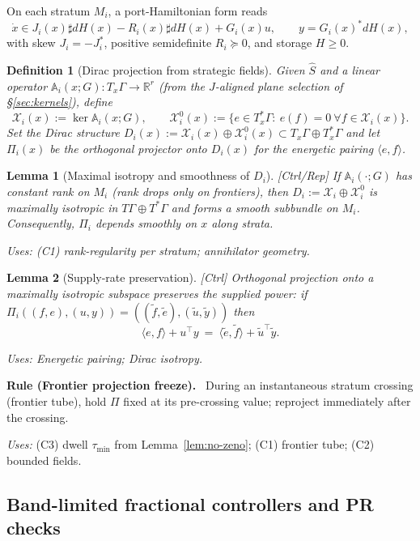 \documentclass[10pt]{article}
\newenvironment{rulex}[1]{%
\begin{rulebox}\noindent\textbf{Rule (#1).}\ }{\end{rulebox}}
\newcommand{\uses}[1]{\par\smallskip\noindent\textit{Uses: }#1\par\smallskip}
\newtheorem{lemma}{Lemma}
\newtheorem{definition}{Definition}
\begin{document}
On each stratum $M_i$, a port-Hamiltonian form reads
\[
\dot x \in J_i(x)\sharp dH(x) - R_i(x)\sharp dH(x) + G_i(x)u,\qquad y=G_i(x)^{\!*} dH(x),
\]
with skew $J_i=-J_i^{\!*}$, positive semidefinite $R_i\succeq 0$, and storage $H\ge 0$. 

\begin{definition}[Dirac projection from strategic fields]\label{def:dirac-proj}
Given $\hat S$ and a linear operator $\mathbb A_i(x;G):T_x\Gamma\to \mathbb R^r$ (from the $J$-aligned plane selection of §\ref{sec:kernels}), define
\[
\mathcal X_i(x):=\ker \mathbb A_i(x;G),\qquad \mathcal X_i^0(x):=\{e\in T_x^*\Gamma:\ e(f)=0\ \forall f\in \mathcal X_i(x)\}.
\]
Set the Dirac structure $D_i(x):=\mathcal X_i(x)\oplus \mathcal X_i^0(x)\subset T_x\Gamma\oplus T_x^*\Gamma$ and let $\Pi_i(x)$ be the orthogonal projector onto $D_i(x)$ for the energetic pairing $\langle e,f\rangle$.
\end{definition}

\begin{lemma}[Maximal isotropy and smoothness of $D_i$]\label{lem:dirac-isotropy}
\emph{[\textup{Ctrl/Rep}]} If $\mathbb A_i(\cdot;G)$ has constant rank on $M_i$ (rank drops only on frontiers), then $D_i:=\mathcal X_i\oplus \mathcal X_i^0$ is maximally isotropic in $T\Gamma\oplus T^*\Gamma$ and forms a smooth subbundle on $M_i$. Consequently, $\Pi_i$ depends smoothly on $x$ along strata.
\uses{(C1) rank-regularity per stratum; annihilator geometry.}
\end{lemma}

\begin{lemma}[Supply-rate preservation]\label{lem:supply}
\emph{[\textup{Ctrl}]} Orthogonal projection onto a maximally isotropic subspace preserves the supplied power: if $\Pi_i((f,e),(u,y))=((\tilde f,\tilde e),(\tilde u,\tilde y))$ then
\[
\langle e,f\rangle + u^\top y \ =\ \langle \tilde e,\tilde f\rangle + \tilde u^\top \tilde y.
\]
\uses{Energetic pairing; Dirac isotropy.}
\end{lemma}

\begin{rulex}{Frontier projection freeze}\label{rule:frontier-freeze}
During an instantaneous stratum crossing (frontier tube), hold $\Pi$ fixed at its pre-crossing value; reproject immediately after the crossing.
\uses{(C3) dwell $\tau_{\min}$ from Lemma~\ref{lem:no-zeno}; (C1) frontier tube; (C2) bounded fields.}
\end{rulex}

\subsection{Band-limited fractional controllers and PR checks}\label{subsec:oust}
\end{document}
